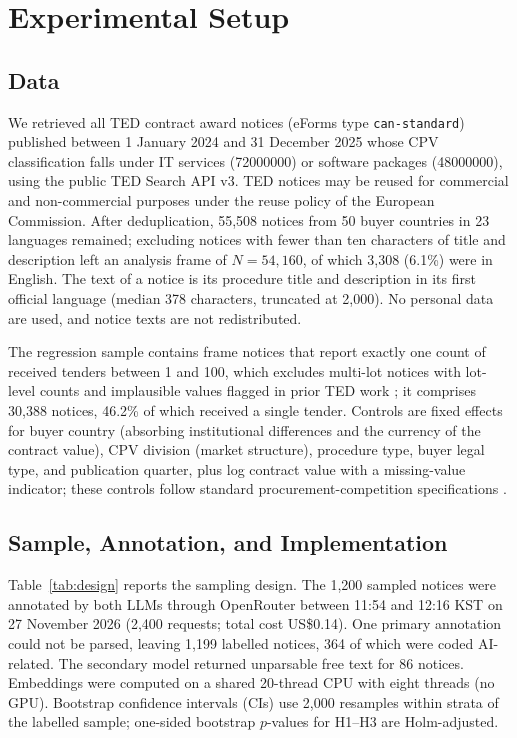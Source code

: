 \section{Experimental Setup}
\subsection{Data}
We retrieved all TED contract award notices (eForms type \texttt{can-standard}) published between 1 January 2024 and 31 December 2025 whose CPV classification falls under IT services (72000000) or software packages (48000000), using the public TED Search API v3. TED notices may be reused for commercial and non-commercial purposes under the reuse policy of the European Commission. After deduplication, 55,508 notices from 50 buyer countries in 23 languages remained; excluding notices with fewer than ten characters of title and description left an analysis frame of $N=54{,}160$, of which 3,308 (6.1\%) were in English. The text of a notice is its procedure title and description in its first official language (median 378 characters, truncated at 2,000). No personal data are used, and notice texts are not redistributed.

The regression sample contains frame notices that report exactly one count of received tenders between 1 and 100, which excludes multi-lot notices with lot-level counts and implausible values flagged in prior TED work \cite{potin2023}; it comprises 30,388 notices, 46.2\% of which received a single tender. Controls are fixed effects for buyer country (absorbing institutional differences and the currency of the contract value), CPV division (market structure), procedure type, buyer legal type, and publication quarter, plus log contract value with a missing-value indicator; these controls follow standard procurement-competition specifications \cite{fazekas2016,decarolis2022}.

\subsection{Sample, Annotation, and Implementation}
Table~\ref{tab:design} reports the sampling design. The 1,200 sampled notices were annotated by both LLMs through OpenRouter between 11:54 and 12:16 KST on 27 November 2026 (2,400 requests; total cost US\$0.14). One primary annotation could not be parsed, leaving 1,199 labelled notices, 364 of which were coded AI-related. The secondary model returned unparsable free text for 86 notices. Embeddings were computed on a shared 20-thread CPU with eight threads (no GPU). Bootstrap confidence intervals (CIs) use 2,000 resamples within strata of the labelled sample; one-sided bootstrap $p$-values for H1--H3 are Holm-adjusted.

